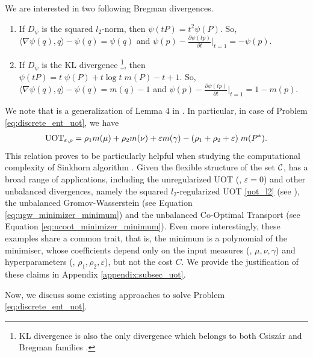 We are interested in two following Bregman divergences.
\begin{enumerate}
  \item If $D_{\psi}$ is the squared $l_2$-norm, then $\psi(tP) = t^2 \psi(P)$. So,
  $\langle \nabla \psi(q), q \rangle - \psi(q) = \psi(q)$ and
  $\psi(p) - \frac{\partial \psi(tp)}{\partial t} \Big|_{t=1} = -\psi(p)$.

  \item If $D_{\psi}$ is the KL divergence
  \footnote{KL divergence is also the only divergence which belongs to both Csiszár and
  Bregman families \citep{Jiantao14}.}, then
  $\psi(tP) = t \; \psi(P) + t \log t \; m(P) - t + 1$.
  So, $\langle \nabla \psi(q), q \rangle - \psi(q) = m(q) - 1$ and
  $\psi(p) - \frac{\partial \psi(tp)}{\partial t} \Big|_{t=1} = 1 - m(p)$.
\end{enumerate}
We note that  is a generalization of Lemma 4 in \citep{Khiem20}.
In particular, in case of Problem \eqref{eq:discrete_ent_uot}, we have
\begin{align}
  \text{UOT}_{\varepsilon, \rho} = \rho_1 m(\mu) + \rho_2 m(\nu) + \varepsilon m(\gamma)
  - (\rho_1 + \rho_2 + \varepsilon) \; m(P^*).
\end{align}
This relation proves to be particularly helpful when studying the computational complexity of
Sinkhorn algorithm \citep{Khiem20}. Given the flexible structure of the set $\mathcal C$,
 has a broad range of applications,
including the unregularized UOT (\ie, $\varepsilon = 0$) and other unbalanced divergences,
namely the squared $l_2$-regularized UOT \eqref{uot_l2} (see ),
the unbalanced Gromov-Wasserstein (see Equation \eqref{eq:ugw_minimizer_minimum})
and the unbalanced Co-Optimal Transport (see Equation \eqref{eq:ucoot_minimizer_minimum}).
Even more interestingly, these examples share a common trait, that is, the minimum is a polynomial
of the minimiser, whose coefficients depend only on the input measures (\ie, $\mu, \nu, \gamma$)
and hyperparameters (\ie, $\rho_1, \rho_2, \varepsilon$), but not the cost $C$.
We provide the justification of these claims in Appendix \ref{appendix:subsec_uot}.

Now, we discuss some existing approaches to solve Problem \eqref{eq:discrete_ent_uot}.

